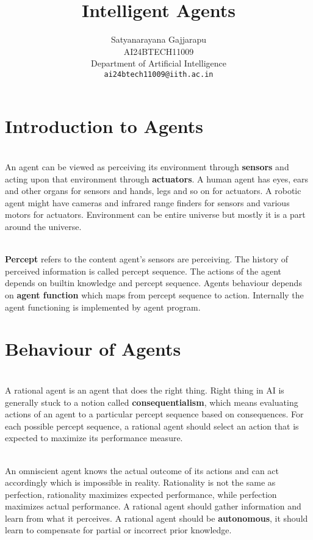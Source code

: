 \documentclass{article}
\title{Intelligent Agents}
\author{%
Satyanarayana Gajjarapu \\
AI24BTECH11009 \\
Department of Artificial Intelligence \\
\texttt{ai24btech11009@iith.ac.in} \\
}
\begin{document}
\maketitle
\section{Introduction to Agents}
\begin{paragraph}
\\
An agent can be viewed as perceiving its environment through \textbf{sensors} and acting upon that environment through \textbf{actuators}. A human agent has eyes, ears and other organs for sensors and hands, legs and so on for actuators. A robotic agent might have cameras and infrared range finders for sensors and various motors for actuators. Environment can be entire universe but mostly it is a part around the universe. 
\end{paragraph}
\begin{paragraph}
\\
\textbf{Percept} refers to the content agent's sensors are perceiving. The history of perceived information is called percept sequence. The actions of the agent depends on builtin knowledge and percept sequence. Agents behaviour depends on \textbf{agent function} which maps from percept sequence to action. Internally the agent functioning is implemented by agent program.
\end{paragraph}
\section{Behaviour of Agents}
\begin{paragraph}
\\
A rational agent is an agent that does the right thing. Right thing in AI is generally stuck to a notion called \textbf{consequentialism}, which means evaluating actions of an agent to a particular percept sequence based on consequences. For each possible percept sequence, a rational agent should select an action that is expected to maximize its performance measure.
\end{paragraph}
\begin{paragraph}
\\
An omniscient agent knows the actual outcome of its actions and can act accordingly which is impossible in reality. Rationality is not the same as perfection, rationality maximizes expected performance, while perfection maximizes actual performance. A rational agent should gather information and learn from what it perceives. A rational agent should be \textbf{autonomous}, it should learn to compensate for partial or incorrect prior knowledge.
\end{paragraph}
\end{document}
